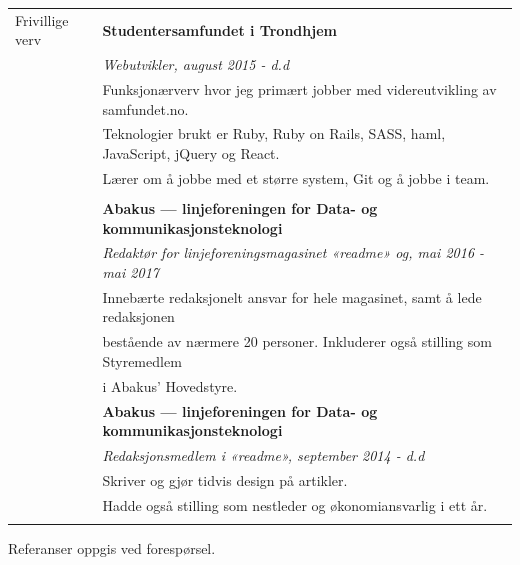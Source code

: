\documentclass[letterpaper,10pt,oneside]{article}
\begin{document}
\begin{longtable}{@{} l l}
 \Large{Frivillige verv}    & \textbf{Studentersamfundet i Trondhjem} \\
 & \textit{Webutvikler, august 2015 - d.d}\\
     & Funksjonærverv hvor jeg primært jobber med videreutvikling av samfundet.no. \\
     & Teknologier brukt er Ruby, Ruby on Rails, SASS, haml, JavaScript, jQuery og React. \\
     & Lærer om å jobbe med et større system, Git og å jobbe i team.\\
     & \\
     & \textbf{Abakus --- linjeforeningen for Data- og kommunikasjonsteknologi} \\
     & \textit{Redaktør for linjeforeningsmagasinet «readme» og, mai 2016 - mai 2017}\\
     & Innebærte redaksjonelt ansvar for hele magasinet, samt å lede redaksjonen \\
     & bestående av nærmere 20 personer. Inkluderer også stilling som Styremedlem \\
     & i Abakus' Hovedstyre. 
     & \\
     & \textbf{Abakus --- linjeforeningen for Data- og kommunikasjonsteknologi} \\
     & \textit{Redaksjonsmedlem i «readme», september 2014 - d.d}\\
     & Skriver og gjør tidvis design på artikler. \\
     & Hadde også stilling som nestleder og økonomiansvarlig i ett år.\\
     & \\

\end{longtable}

Referanser oppgis ved forespørsel.
\end{document}

